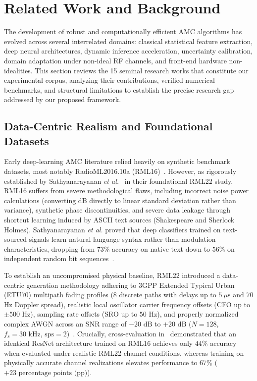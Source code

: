 
\section{Related Work and Background}
\label{sec:related_work}

The development of robust and computationally efficient AMC algorithms has evolved across several interrelated domains: classical statistical feature extraction, deep neural architectures, dynamic inference acceleration, uncertainty calibration, domain adaptation under non-ideal RF channels, and front-end hardware non-idealities. This section reviews the 15 seminal research works that constitute our experimental corpus, analyzing their contributions, verified numerical benchmarks, and structural limitations to establish the precise research gap addressed by our proposed framework.

\subsection{Data-Centric Realism and Foundational Datasets}
\label{subsec:rel_rml22}

Early deep-learning AMC literature relied heavily on synthetic benchmark datasets, most notably RadioML2016.10a (RML16)~\cite{wang2025survey}. However, as rigorously established by Sathyanarayanan \emph{et al.}~\cite{sathyanarayanan2023rml22} in their foundational RML22 study, RML16 suffers from severe methodological flaws, including incorrect noise power calculations (converting dB directly to linear standard deviation rather than variance), synthetic phase discontinuities, and severe data leakage through shortcut learning induced by ASCII text sources (Shakespeare and Sherlock Holmes). Sathyanarayanan \emph{et al.} proved that deep classifiers trained on text-sourced signals learn natural language syntax rather than modulation characteristics, dropping from $73\%$ accuracy on native text down to $56\%$ on independent random bit sequences~\cite[Table~VIII]{sathyanarayanan2023rml22}.

To establish an uncompromised physical baseline, RML22 introduced a data-centric generation methodology adhering to 3GPP Extended Typical Urban (ETU70) multipath fading profiles (8 discrete paths with delays up to $5\ \mu\text{s}$ and 70 Hz Doppler spread), realistic local oscillator carrier frequency offsets (CFO up to $\pm 500\text{ Hz}$), sampling rate offsets (SRO up to $50\text{ Hz}$), and properly normalized complex AWGN across an SNR range of $-20\text{ dB}$ to $+20\text{ dB}$ ($N=128$, $f_s=30\text{ kHz}$, $\text{sps}=2$)~\cite{sathyanarayanan2023rml22}. Crucially, cross-evaluation in~\cite[Table~VI]{sathyanarayanan2023rml22} demonstrated that an identical ResNet architecture trained on RML16 achieves only $44\%$ accuracy when evaluated under realistic RML22 channel conditions, whereas training on physically accurate channel realizations elevates performance to $67\%$ ($+23\text{ percentage points (pp)}$). 

